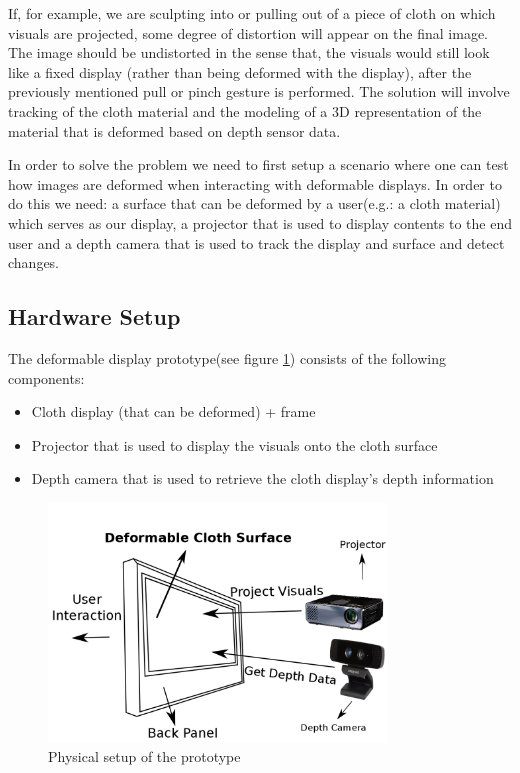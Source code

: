 \documentclass[]{article}
\begin{document}
If, for example, we are sculpting into or pulling out of a piece of cloth on which visuals are projected, some degree of distortion will appear on the final image. 
The image should be undistorted in the sense that, the visuals would still look like a fixed display (rather than being deformed with the display), after the previously mentioned pull or pinch gesture is performed. The solution will involve tracking of the cloth material and the modeling of a 3D representation of the material that is deformed based on depth sensor data.

In order to solve the problem we need to first setup a scenario where one can test how images are deformed when interacting with deformable displays. In order to do this we need: a surface that can be deformed by a user(e.g.: a cloth material) which serves as our display, a projector that is used to display contents to the end user and a depth camera that is used to track the display and surface and detect changes.

\subsection{Hardware Setup}

The deformable display prototype(see figure \ref{fig:hardware_setup}) consists of the following components:
\begin{itemize}
\item Cloth display (that can be deformed) + frame
\item Projector that is used to display the visuals onto the cloth surface
\item Depth camera that is used to retrieve the cloth display’s depth information
\end{itemize}

\begin{figure}[hbtp]
    \centering
    \includegraphics[width=0.8\textwidth]{figures/thesis_setup_illustration_ui.png}
    \caption{Physical setup of the prototype}
    \label{fig:hardware_setup}
\end{figure}
\end{document}
